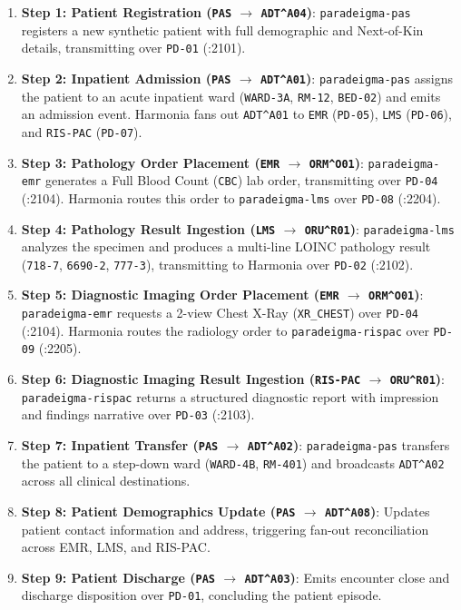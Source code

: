 \begin{enumerate}
    \item \textbf{Step 1: Patient Registration (\texttt{PAS} $\to$ \texttt{ADT\^{}A04})}: \texttt{paradeigma-pas} registers a new synthetic patient with full demographic and Next-of-Kin details, transmitting over \texttt{PD-01} (:2101).
    \item \textbf{Step 2: Inpatient Admission (\texttt{PAS} $\to$ \texttt{ADT\^{}A01})}: \texttt{paradeigma-pas} assigns the patient to an acute inpatient ward (\texttt{WARD-3A}, \texttt{RM-12}, \texttt{BED-02}) and emits an admission event. Harmonia fans out \texttt{ADT\^{}A01} to \texttt{EMR} (\texttt{PD-05}), \texttt{LMS} (\texttt{PD-06}), and \texttt{RIS-PAC} (\texttt{PD-07}).
    \item \textbf{Step 3: Pathology Order Placement (\texttt{EMR} $\to$ \texttt{ORM\^{}O01})}: \texttt{paradeigma-emr} generates a Full Blood Count (\texttt{CBC}) lab order, transmitting over \texttt{PD-04} (:2104). Harmonia routes this order to \texttt{paradeigma-lms} over \texttt{PD-08} (:2204).
    \item \textbf{Step 4: Pathology Result Ingestion (\texttt{LMS} $\to$ \texttt{ORU\^{}R01})}: \texttt{paradeigma-lms} analyzes the specimen and produces a multi-line LOINC pathology result (\texttt{718-7}, \texttt{6690-2}, \texttt{777-3}), transmitting to Harmonia over \texttt{PD-02} (:2102).
    \item \textbf{Step 5: Diagnostic Imaging Order Placement (\texttt{EMR} $\to$ \texttt{ORM\^{}O01})}: \texttt{paradeigma-emr} requests a 2-view Chest X-Ray (\texttt{XR\_CHEST}) over \texttt{PD-04} (:2104). Harmonia routes the radiology order to \texttt{paradeigma-rispac} over \texttt{PD-09} (:2205).
    \item \textbf{Step 6: Diagnostic Imaging Result Ingestion (\texttt{RIS-PAC} $\to$ \texttt{ORU\^{}R01})}: \texttt{paradeigma-rispac} returns a structured diagnostic report with impression and findings narrative over \texttt{PD-03} (:2103).
    \item \textbf{Step 7: Inpatient Transfer (\texttt{PAS} $\to$ \texttt{ADT\^{}A02})}: \texttt{paradeigma-pas} transfers the patient to a step-down ward (\texttt{WARD-4B}, \texttt{RM-401}) and broadcasts \texttt{ADT\^{}A02} across all clinical destinations.
    \item \textbf{Step 8: Patient Demographics Update (\texttt{PAS} $\to$ \texttt{ADT\^{}A08})}: Updates patient contact information and address, triggering fan-out reconciliation across EMR, LMS, and RIS-PAC.
    \item \textbf{Step 9: Patient Discharge (\texttt{PAS} $\to$ \texttt{ADT\^{}A03})}: Emits encounter close and discharge disposition over \texttt{PD-01}, concluding the patient episode.
\end{enumerate}

